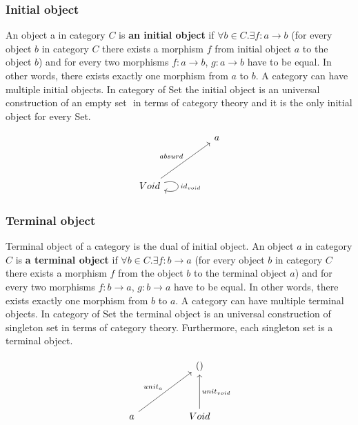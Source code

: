 \documentclass[article]{aaltoseries}
\begin{document}

  \subsubsection{Initial object}
    An object a in category $C$ is \textbf{an initial object} if $\forall b \in
    C. \exists f: a \rightarrow b$ (for every object $b$ in category $C$ there
    exists a morphism $f$ from initial object $a$ to the object $b$) and for
    every two morphisms $f: a \rightarrow b$, $g: a \rightarrow b$ have to be
    equal. In other words, there exists exactly one morphism from $a$ to $b$. A
    category can have multiple initial objects. In category of Set the initial
    object is an universal construction of an empty set ${}$ in terms of
    category theory and it is the only initial object for every Set.

    \[
      \begin{tikzcd}[row sep=huge, column sep=huge]
        & a \\
        Void \arrow[ur, "absurd"]
        \arrow[loop right, distance=2em, "id_{void}"]
        & 
      \end{tikzcd}
    \]


  \subsubsection{Terminal object}
    Terminal object of a category is the dual of initial object. An object $a$
    in category $C$ is \textbf{a terminal object} if $\forall b \in C. \exists
    f: b \rightarrow a$ (for every object $b$ in category $C$ there exists a
    morphism $f$ from the object $b$ to the terminal object $a$) and for every
    two morphisms $f: b \rightarrow a$, $g: b \rightarrow a$ have to be equal.
    In other words, there exists exactly one morphism from $b$ to $a$. A
    category can have multiple terminal objects. In category of Set the terminal
    object is an universal construction of singleton set in terms of category
    theory. Furthermore, each singleton set is a terminal object.

    \[
      \begin{tikzcd}[row sep=huge, column sep=huge]
        & () \\
        a \arrow[ur, "unit_a"]
        & Void \arrow[u, "unit_{void}"']
      \end{tikzcd}
    \]
   
\end{document}
